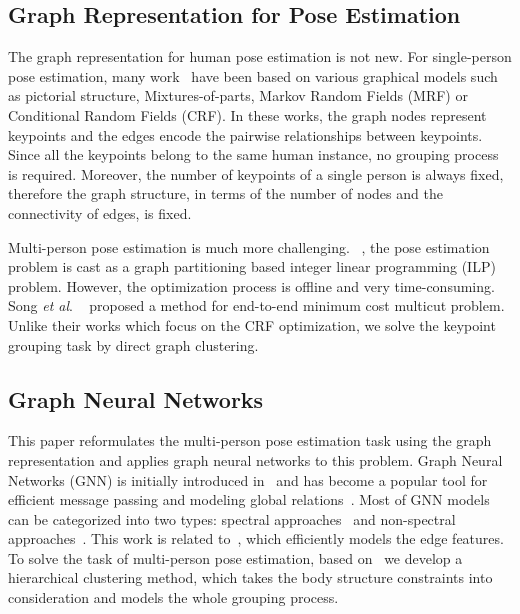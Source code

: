\documentclass[runningheads]{llncs}
\newcommand{\etal}{\textit{et al}. }
\begin{document}
	\subsection{Graph Representation for Pose Estimation}
	
	The graph representation for human pose estimation is not new. For single-person pose estimation, many work~\cite{chen2014detect,chen2014articulated,chu2016crf,felzenszwalb2005pictorial,fischler1973representation,johnson2010clustered,tompson2014joint,yang2012articulated} have been based on various graphical models such as pictorial structure, Mixtures-of-parts, Markov Random Fields (MRF) or Conditional Random Fields (CRF). In these works, the graph nodes represent keypoints and the edges encode the pairwise relationships between keypoints. Since all the keypoints belong to the same human instance, no grouping process is required. Moreover, the number of keypoints of a single person is always fixed, therefore the graph structure, in terms of the number of nodes and the connectivity of edges, is fixed. 
	
	Multi-person pose estimation is much more challenging. ~\cite{Insafutdinov2016ArtTrack,Iqbal2016PoseTrack,wang2018bi}, the pose estimation problem is cast as a graph partitioning based integer linear programming (ILP) problem. However, the optimization process is offline and very time-consuming. Song \etal~\cite{song2019end} proposed a method for end-to-end minimum cost multicut problem. Unlike their works which focus on the CRF optimization, we solve the keypoint grouping task by direct graph clustering.
	
	\subsection{Graph Neural Networks}
	
	This paper reformulates the multi-person pose estimation task using the graph representation and applies graph neural networks to this problem. Graph Neural Networks (GNN) is initially introduced in~\cite{gori2005new,scarselli2008graph} and has become a popular tool for efficient message passing and modeling global relations~\cite{chen2019graph}. Most of GNN models can be categorized into two types: spectral approaches~\cite{bruna2013spectral,kipf2016semi} and non-spectral approaches~\cite{duvenaud2015convolutional,wang2019dynamic}. This work is related to~\cite{wang2019dynamic}, which efficiently models the edge features. To solve the task of multi-person pose estimation, based on~\cite{wang2019dynamic} we develop a hierarchical clustering method, which takes the body structure constraints into consideration and models the whole grouping process.
	
\end{document}
